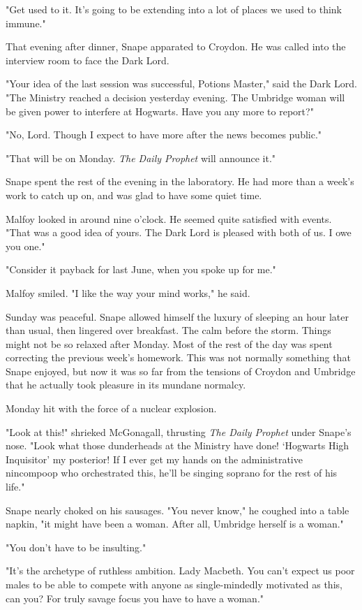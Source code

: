"Get used to it. It's going to be extending into a lot of places we used to think immune."

That evening after dinner, Snape apparated to Croydon. He was called into the interview room to face the Dark Lord.

"Your idea of the last session was successful, Potions Master," said the Dark Lord. "The Ministry reached a decision yesterday evening. The Umbridge woman will be given power to interfere at Hogwarts. Have you any more to report?"

"No, Lord. Though I expect to have more after the news becomes public."

"That will be on Monday. \emph{The Daily Prophet} will announce it."

Snape spent the rest of the evening in the laboratory. He had more than a week's work to catch up on, and was glad to have some quiet time.

Malfoy looked in around nine o'clock. He seemed quite satisfied with events. "That was a good idea of yours. The Dark Lord is pleased with both of us. I owe you one."

"Consider it payback for last June, when you spoke up for me."

Malfoy smiled. "I like the way your mind works," he said.

Sunday was peaceful. Snape allowed himself the luxury of sleeping an hour later than usual, then lingered over breakfast. The calm before the storm. Things might not be so relaxed after Monday. Most of the rest of the day was spent correcting the previous week's homework. This was not normally something that Snape enjoyed, but now it was so far from the tensions of Croydon and Umbridge that he actually took pleasure in its mundane normalcy.

Monday hit with the force of a nuclear explosion.

"Look at this!" shrieked McGonagall, thrusting \emph{The Daily Prophet} under Snape's nose. "Look what those dunderheads at the Ministry have done! `Hogwarts High Inquisitor' my posterior! If I ever get my hands on the administrative nincompoop who orchestrated this, he'll be singing soprano for the rest of his life."

Snape nearly choked on his sausages. "You never know," he coughed into a table napkin, "it might have been a woman. After all, Umbridge herself is a woman."

"You don't have to be insulting."

"It's the archetype of ruthless ambition. Lady Macbeth. You can't expect us poor males to be able to compete with anyone as single-mindedly motivated as this, can you? For truly savage focus you have to have a woman."

